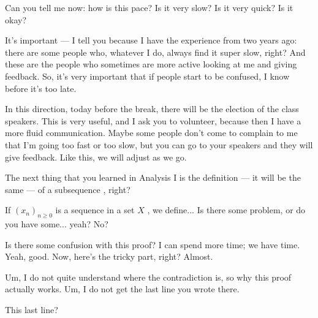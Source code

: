 \begin{hidden}
\end{hidden}

\begin{speech}[00:14:15 - 00:16:35]
Can you tell me now: how is this pace? Is it very slow? Is it very quick? Is it okay?

It's important --- I tell you because I have the experience from two years ago: there are some people who, whatever I do, always find it super slow, right? And these are the people who sometimes are more active looking at me and giving feedback. So, it's very important that if people start to be confused, I know before it's too late.

In this direction, today before the break, there will be the election of the class speakers. This is very useful, and I ask you to volunteer, because then I have a more fluid communication. Maybe some people don't come to complain to me that I'm going too fast or too slow, but you can go to your speakers and they will give feedback. Like this, we will adjust as we go.

 The next thing that you learned in Analysis I is the definition --- it will be the same --- of a subsequence , right?

If $(x_n)_{n \ge 0}$ is a sequence in a set $X$ , we define...  Is there some problem, or do you have some... yeah? No?

Is there some confusion with this proof? I can spend more time; we have time. Yeah, good.  Now, here's the tricky part, right?  Almost.
\end{speech}

\begin{student}
Um, I do not quite understand where the contradiction is, so why this proof actually works. Um, I do not get the last line you wrote there.
\end{student}

\begin{speech}[00:17:01 - 00:17:08]
This last line? 
\end{speech}

